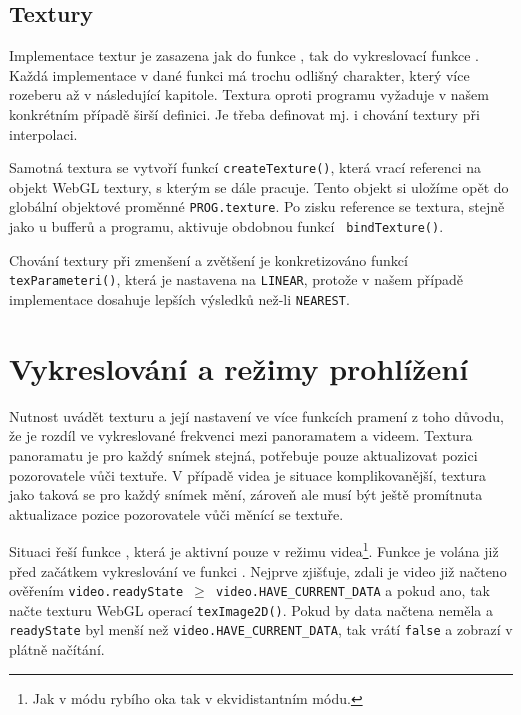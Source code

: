 \subsection{Textury}
Implementace textur je zasazena jak do funkce \texttt{\setupProgram}, tak do vykreslovací funkce \texttt{\render}. Každá implementace v dané funkci má trochu odlišný charakter, který více rozeberu až v následující kapitole. Textura oproti programu vyžaduje v našem konkrétním případě širší definici. Je třeba definovat mj. i chování textury při interpolaci.

Samotná textura se vytvoří funkcí \texttt{createTexture()}, která vrací referenci na objekt WebGL textury, s kterým se dále pracuje. Tento objekt si uložíme opět do globální objektové proměnné \texttt{PROG.texture}. Po zisku  reference se textura, stejně jako u bufferů a programu, aktivuje obdobnou funkcí \texttt{ bindTexture()}.

Chování textury při zmenšení a zvětšení je konkretizováno funkcí \texttt{texParameteri()}, která je nastavena na \texttt{LINEAR}, protože v našem případě implementace dosahuje lepších výsledků než-li \texttt{NEAREST}.


\newpage

\section{Vykreslování a režimy prohlížení}
Nutnost uvádět texturu a její nastavení ve více funkcích pramení z toho důvodu, že je rozdíl ve vykreslované frekvenci mezi panoramatem a videem. Textura panoramatu je pro každý snímek stejná, potřebuje pouze aktualizovat pozici pozorovatele vůči textuře. V případě videa je situace komplikovanější, textura jako taková se pro každý snímek mění, zároveň ale musí být ještě promítnuta aktualizace pozice pozorovatele vůči měnící se textuře. 

Situaci řeší funkce \texttt{\updateTexture}, která je aktivní pouze v režimu videa\footnote{Jak v módu rybího oka tak v ekvidistantním módu.}. Funkce je volána již před začátkem vykreslování ve funkci \texttt{\render}. Nejprve zjišťuje, zdali je video již načteno  ověřením \texttt{video.readyState $\geq$ video.HAVE\_CURRENT\_DATA} a pokud ano, tak načte texturu WebGL operací \texttt{texImage2D()}. Pokud by data načtena neměla a \texttt{readyState} byl menší než \texttt{video.HAVE\_CURRENT\_DATA}, tak vrátí \texttt{false} a zobrazí  v plátně načítání.


